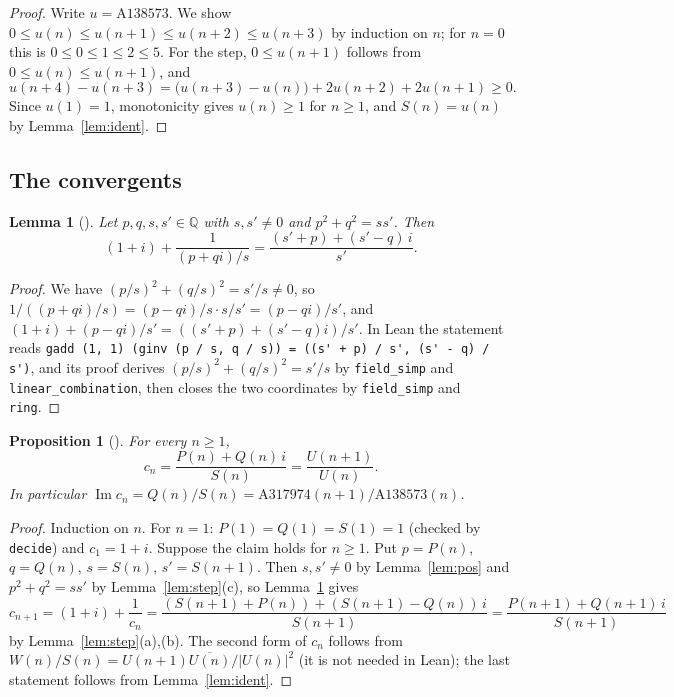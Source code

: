 \documentclass[11pt]{amsart}
\theoremstyle{plain}
\newtheorem{lemma}[theorem]{Lemma}
\newtheorem{proposition}[theorem]{Proposition}
\theoremstyle{definition}
\newcommand{\li}{\lstinline[basicstyle=\ttfamily]}
\newcommand{\Q}{\mathbb{Q}}
\newcommand{\cj}[1]{\overline{#1}}
\newcommand{\seq}[1]{\mathrm{A#1}}
\DeclareMathOperator{\im}{Im}
\begin{document}
\begin{proof}
Write $u=\seq{138573}$. We show $0\le u(n)\le u(n+1)\le u(n+2)\le u(n+3)$ by induction on $n$; for $n=0$ this is $0\le0\le1\le2\le5$. For the step, $0\le u(n+1)$ follows from $0\le u(n)\le u(n+1)$, and
\[
u(n+4)-u(n+3)=\bigl(u(n+3)-u(n)\bigr)+2u(n+2)+2u(n+1)\ge0.
\]
Since $u(1)=1$, monotonicity gives $u(n)\ge1$ for $n\ge1$, and $S(n)=u(n)$ by Lemma~\ref{lem:ident}.
\end{proof}

\subsection{The convergents}

\begin{lemma}[]\label{lem:alg}
Let $p,q,s,s'\in\Q$ with $s,s'\ne0$ and $p^2+q^2=ss'$. Then
\[
(1+i)+\frac{1}{(p+qi)/s}=\frac{(s'+p)+(s'-q)\,i}{s'}.
\]
\end{lemma}

\begin{proof}
We have $(p/s)^2+(q/s)^2=s'/s\neq0$, so $1/((p+qi)/s)=(p-qi)/s\cdot s/s'=(p-qi)/s'$, and $(1+i)+(p-qi)/s'=((s'+p)+(s'-q)i)/s'$. In Lean the statement reads \li|gadd (1, 1) (ginv (p / s, q / s)) = ((s' + p) / s', (s' - q) / s')|, and its proof derives $(p/s)^2+(q/s)^2=s'/s$ by \texttt{field\_simp} and \texttt{linear\_combination}, then closes the two coordinates by \texttt{field\_simp} and \texttt{ring}.
\end{proof}

\begin{proposition}[]\label{prop:conv}
For every $n\ge1$,
\[
c_n=\frac{P(n)+Q(n)\,i}{S(n)}=\frac{U(n+1)}{U(n)}.
\]
In particular $\im c_n=Q(n)/S(n)=\seq{317974}(n+1)/\seq{138573}(n)$.
\end{proposition}

\begin{proof}
Induction on $n$. For $n=1$: $P(1)=Q(1)=S(1)=1$ (checked by \texttt{decide}) and $c_1=1+i$. Suppose the claim holds for $n\ge1$. Put $p=P(n)$, $q=Q(n)$, $s=S(n)$, $s'=S(n+1)$. Then $s,s'\ne0$ by Lemma~\ref{lem:pos} and $p^2+q^2=ss'$ by Lemma~\ref{lem:step}(c), so Lemma~\ref{lem:alg} gives
\[
c_{n+1}=(1+i)+\frac1{c_n}=\frac{(S(n+1)+P(n))+(S(n+1)-Q(n))\,i}{S(n+1)}=\frac{P(n+1)+Q(n+1)\,i}{S(n+1)}
\]
by Lemma~\ref{lem:step}(a),(b). The second form of $c_n$ follows from $W(n)/S(n)=U(n+1)\cj{U(n)}/|U(n)|^2$ (it is not needed in Lean); the last statement follows from Lemma~\ref{lem:ident}.
\end{proof}
\end{document}
